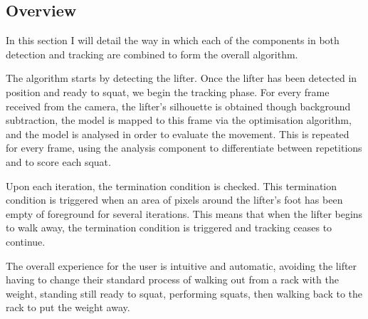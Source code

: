 \subsection{Overview}

In this section I will detail the way in which each of the components in both detection and tracking are combined to form the overall algorithm.

The algorithm starts by detecting the lifter. Once the lifter has been detected in position and ready to squat, we begin the tracking phase. For every frame received from the camera, the lifter's silhouette is obtained though background subtraction, the model is mapped to this frame via the optimisation algorithm, and the model is analysed in order to evaluate the movement. This is repeated for every frame, using the analysis component to differentiate between repetitions and to score each squat.

Upon each iteration, the termination condition is checked. This termination condition is triggered when an area of pixels around the lifter's foot has been empty of foreground for several iterations. This means that when the lifter begins to walk away, the termination condition is triggered and tracking ceases to continue.

The overall experience for the user is intuitive and automatic, avoiding the lifter having to change their standard process of walking out from a rack with the weight, standing still ready to squat, performing squats, then walking back to the rack to put the weight away.